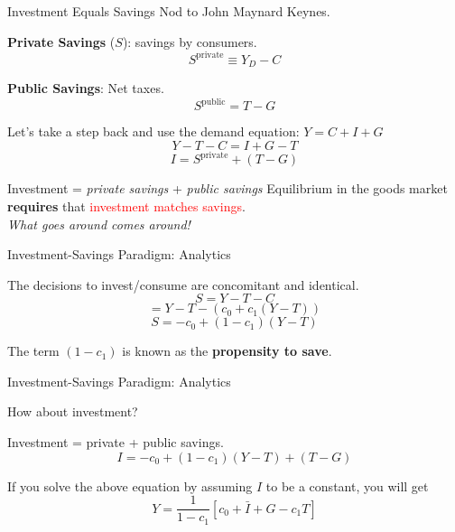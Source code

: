 \documentclass[shownotes,11pt, aspectratio=169]{beamer}
\newenvironment{wideitemize}{\itemize\addtolength{\itemsep}{10pt}}{\enditemize}
\begin{document}
\begin{frame}{Investment Equals Savings}
Nod to John Maynard Keynes.
\begin{wideitemize}
\item \textbf{Private Savings} ($S$): savings by consumers.
      \[ S^{\text{private}} \equiv Y_D - C \]
\item \textbf{Public Savings}: Net taxes.
      \[ S^{\text{public}} = T - G \]
\pause
\item Let's take a step back and use the demand equation: $Y = C + I + G$
     \[ Y - T - C = I + G - T \]
     \pause
     \[ I = S^{\text{private}} + (T - G) \]    
\item Investment = \textit{private savings} + \textit{public savings}
\end{wideitemize}
Equilibrium in the goods market \textbf{requires} that \textcolor{red}{investment matches savings}. \\
\pause
\textit{What goes around comes around!}
\end{frame}

\begin{frame}{Investment-Savings Paradigm: Analytics}
\begin{wideitemize}
\item The decisions to invest/consume are concomitant and identical.
     \[ S = Y - T - C \] \pause
     \[   = Y - T - (c_0 + c_1(Y - T)) \] \pause
     \[ S = -c_0 + (1 - c_1)(Y - T) \]
\item The term $(1 - c_1)$ is known as the \textbf{propensity to save}.
\end{wideitemize}
\end{frame}

\begin{frame}{Investment-Savings Paradigm: Analytics}
\begin{wideitemize}
\item How about investment?
\item Investment = private + public savings.
     \[ I = -c_0 + (1 - c_1)(Y - T) + (T - G) \]
 \pause
 \item If you solve the above equation by assuming $I$ to be a constant, you will get \\
     \[ Y = \frac{1}{1 - c_1}[c_0 + \bar{I} + G - c_1T] \]
\end{wideitemize}
\end{frame}
\end{document}
